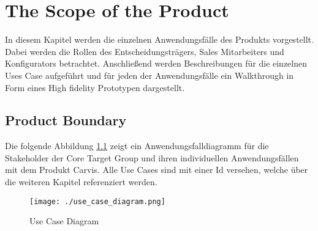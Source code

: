 \chapter{The Scope of the Product}
In diesem Kapitel werden die einzelnen Anwendungsfälle des Produkts vorgestellt. Dabei werden die Rollen des Entscheidungsträgers, Sales Mitarbeiters und Konfigurators betrachtet. Anschließend werden Beschreibungen für die einzelnen Uses Case aufgeführt und für jeden der Anwendungsfälle ein Walkthrough in Form eines High fidelity Prototypen dargestellt.
\section{Product Boundary}
Die folgende Abbildung \ref{SopeOfProduct:ContextDiagram} zeigt ein Anwendungsfalldiagramm für die Stakeholder der Core Target Group und ihren individuellen Anwendungsfällen mit dem Produkt Carvis. Alle Use Cases sind mit einer Id versehen, welche über die weiteren Kapitel referenziert werden.
\begin{figure}[ht]
  \centering
  \texttt{[image: ./use\_case\_diagram.png]}
  \caption{Use Case Diagram}
  \label{SopeOfProduct:ContextDiagram}
\end{figure}
